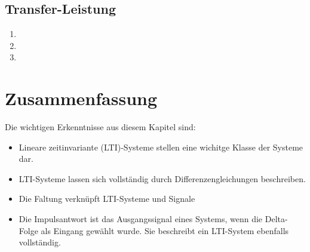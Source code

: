 \subsection{Transfer-Leistung}
\begin{enumerate}
    \item
    \item
    \item
\end{enumerate}
%
{
\section{Zusammenfassung}
Die wichtigen Erkenntnisse aus diesem Kapitel sind:
\begin{itemize}
    \item Lineare zeitinvariante (LTI)-Systeme stellen eine wichitge Klasse der Systeme dar.
    \item LTI-Systeme lassen sich vollständig durch Differenzengleichungen beschreiben.
    \item Die Faltung verknüpft LTI-Systeme und Signale
    \item Die Impulsantwort ist das Ausgangssignal eines Systems, wenn die Delta-Folge als
    Eingang gewählt wurde. Sie beschreibt ein LTI-System ebenfalls vollständig.
\end{itemize}
}

